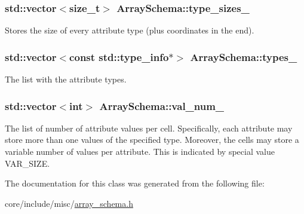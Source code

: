 \subsubsection[{type\+\_\+sizes\+\_\+}]{\setlength{\rightskip}{0pt plus 5cm}std\+::vector$<$size\+\_\+t$>$ Array\+Schema\+::type\+\_\+sizes\+\_\+\hspace{0.3cm}{\ttfamily [private]}}\label{classArraySchema_a13d059194797b852c97cb0dfc7226249}
Stores the size of every attribute type (plus coordinates in the end). \hypertarget{classArraySchema_a80d3c3d1161f55719bb3848175ae49fa}{}
\subsubsection[{types\+\_\+}]{\setlength{\rightskip}{0pt plus 5cm}std\+::vector$<$const std\+::type\+\_\+info$\ast$$>$ Array\+Schema\+::types\+\_\+\hspace{0.3cm}{\ttfamily [private]}}\label{classArraySchema_a80d3c3d1161f55719bb3848175ae49fa}
The list with the attribute types. \hypertarget{classArraySchema_ab9dce02b21f7c1124c54fdc339d8c96a}{}
\subsubsection[{val\+\_\+num\+\_\+}]{\setlength{\rightskip}{0pt plus 5cm}std\+::vector$<$int$>$ Array\+Schema\+::val\+\_\+num\+\_\+\hspace{0.3cm}{\ttfamily [private]}}\label{classArraySchema_ab9dce02b21f7c1124c54fdc339d8c96a}
The list of number of attribute values per cell. Specifically, each attribute may store more than one values of the specified type. Moreover, the cells may store a variable number of values per attribute. This is indicated by special value V\+A\+R\+\_\+\+S\+I\+Z\+E. 

The documentation for this class was generated from the following file\+:\begin{DoxyCompactItemize}
\item 
core/include/misc/\hyperlink{array__schema_8h}{array\+\_\+schema.\+h}\end{DoxyCompactItemize}
